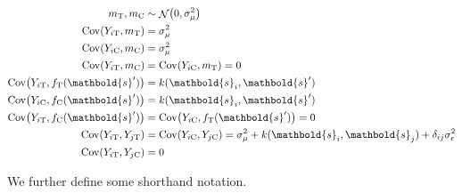 \documentclass[letter]{article}
\DeclarePairedDelimiter{\parenthesis}{\lparen}{\rparen}
\newcommand{\del}[1]{\parenthesis*{#1}}
\DeclareMathOperator{\cov}{{Cov}}
\DeclareMathOperator{\normal}{\mathcal{N}}
\newcommand{\treat}{\mathrm{T}}
\newcommand{\ctrol}{\mathrm{C}}
\newcommand{\sigman}{\sigma_{\epsilon}}
\newcommand{\sigmamu}{\sigma_{\mu}}
\newcommand{\svec}{\mathbold{s}}
\newcommand{\eqlabel}[1]{\label{#1}}
\begin{document}
    	\begin{equation}
\begin{split}
    m_\treat, m_\ctrol   &\sim \normal\del{0,\sigmamu^2} \\
    \cov(Y_{i\treat},m_\treat)  &= \sigmamu^2 \\
    \cov(Y_{i\ctrol},m_\ctrol)  &= \sigmamu^2 \\
    \cov(Y_{i\treat},m_\ctrol)  &= \cov(Y_{i\ctrol},m_\treat)  = 0 \\
    \cov\del{Y_{i\treat}, f_{\treat}(\svec')} &= k(\svec_i,\svec') \\
    \cov\del{Y_{i\ctrol}, f_{\ctrol}(\svec')} &= k(\svec_i,\svec') \\
    \cov\del{Y_{i\treat}, f_{\ctrol}(\svec')} &= \cov\del{Y_{i\ctrol}, f_{\treat}(\svec')} = 0 \\
    \cov(Y_{i\treat},Y_{j\treat}) &= \cov(Y_{i\ctrol},Y_{j\ctrol}) = \sigmamu^2 + k(\svec_i,\svec_j) + \delta_{ij}\sigman^2 \\
    \cov(Y_{i\treat},Y_{j\ctrol}) &= 0
\end{split}
\eqlabel{eq:covariances}
\end{equation}
    


    	We further define some shorthand notation.
\end{document}
